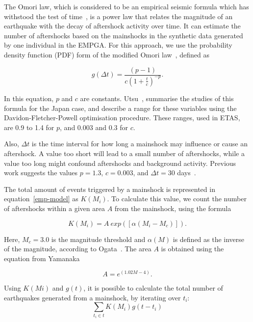 The Omori law, which is considered to be an empirical seismic formula
which has withstood the test of
time~\cite{utsu1995centenary,omori1895after}, is a power law that
relates the magnitude of an earthquake with the decay of aftershock
activity over time. It can estimate the number of aftershocks based on
the mainshocks in the synthetic data generated by one individual in
the EMPGA. For this approach, we use the probability density function
(PDF) form of the modified Omori law~\cite{zhuang2004analyzing},
defined as

\begin{equation}\label{omori}
  g(\Delta t)= \frac{(p-1)}{c(1+ \frac{t}{c})^{-p}}.
\end{equation}

In this equation, $p$ and $c$ are
constants. Utsu~\cite{utsu1995centenary}, summarise the studies of
this formula for the Japan case, and describe a range for these
variables using the Davidon-Fletcher-Powell optimisation
procedure. These ranges, used in ETAS, are 0.9 to 1.4 for $p$, and
0.003 and 0.3 for $c$.

Also, $\Delta t$ is the time interval for how long a mainshock may
influence or cause an aftershock. A value too short will lead to a
small number of aftershocks, while a value too long might confound
aftershocks and background activity. Previous work suggests the values
$p = 1.3$, $c = 0.003$, and $\Delta t = 30$
days~\cite{yamanaka1990scaling}.

The total amount of events triggered by a mainshock is represented in
equation~\ref{emp-model} as $K(M_i)$. To calculate this value,
we count the number of aftershocks within a given area $A$ from
the mainshock, using the formula

\begin{equation}\label{triggered}
 K(M_i) = A\ exp([\alpha(M_i-M_c)]).
\end{equation}

Here, $M_c = 3.0$ is the magnitude threshold and $\alpha(M)$ is defined
as the inverse of the magnitude, according to
Ogata~\cite{ogata2006space}. The area $A$ is obtained using the
equation from Yamanaka~\cite{yamanaka1990scaling}

\begin{equation}
A = e^{(1.02M -4)}.
\end{equation}

Using $K(Mi)$ and $g(t)$, it is possible to calculate the total number
of earthquakes generated from a mainshock, by iterating over $t_i$:
\begin{equation}
\displaystyle\sum_{t_i \in t} K(M_i)g(t-t_i)
\end{equation}


